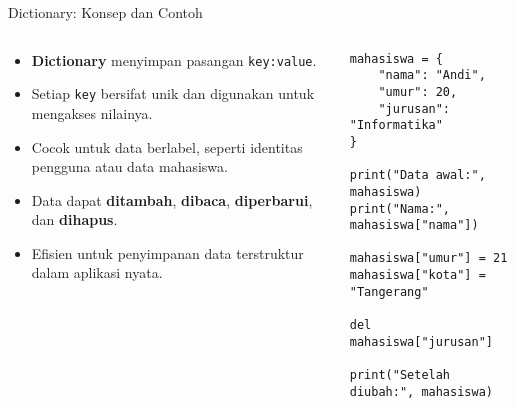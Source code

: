\documentclass[aspectratio=169, table]{beamer}
\begin{document}
\begin{frame}[fragile]{Dictionary: Konsep dan Contoh}
\vspace{20pt}

\begin{columns}[T]
  \begin{column}{0.48\textwidth}
    \begin{itemize}
      \item \textbf{Dictionary} menyimpan pasangan \texttt{key:value}.
      \item Setiap \texttt{key} bersifat unik dan digunakan untuk mengakses nilainya.
      \item Cocok untuk data berlabel, seperti identitas pengguna atau data mahasiswa.
      \item Data dapat \textbf{ditambah}, \textbf{dibaca}, \textbf{diperbarui}, dan \textbf{dihapus}.
      \item Efisien untuk penyimpanan data terstruktur dalam aplikasi nyata.
    \end{itemize}
  \end{column}

  \begin{column}{0.48\textwidth}
    \begin{lstlisting}[style=PythonStyle]
mahasiswa = {
    "nama": "Andi",
    "umur": 20,
    "jurusan": "Informatika"
}

print("Data awal:", mahasiswa)
print("Nama:", mahasiswa["nama"])

mahasiswa["umur"] = 21
mahasiswa["kota"] = "Tangerang"

del mahasiswa["jurusan"]

print("Setelah diubah:", mahasiswa)
    \end{lstlisting}
  \end{column}
\end{columns}

\end{frame}
\end{document}

